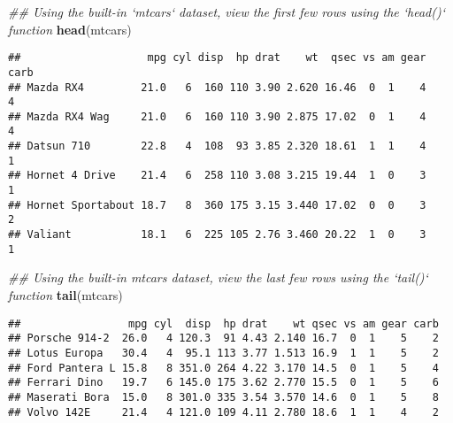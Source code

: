 \documentclass[
]{article}
\newenvironment{Shaded}{\begin{snugshade}}{\end{snugshade}}
\newcommand{\CommentTok}[1]{\textcolor[rgb]{0.56,0.35,0.01}{\textit{#1}}}
\newcommand{\KeywordTok}[1]{\textcolor[rgb]{0.13,0.29,0.53}{\textbf{#1}}}
\newcommand{\NormalTok}[1]{#1}
\begin{document}
\begin{Shaded}
\begin{Highlighting}[]
\CommentTok{## Using the built-in `mtcars` dataset, view the first few rows using the `head()` function}
\KeywordTok{head}\NormalTok{(mtcars)}
\end{Highlighting}
\end{Shaded}

\begin{verbatim}
##                    mpg cyl disp  hp drat    wt  qsec vs am gear carb
## Mazda RX4         21.0   6  160 110 3.90 2.620 16.46  0  1    4    4
## Mazda RX4 Wag     21.0   6  160 110 3.90 2.875 17.02  0  1    4    4
## Datsun 710        22.8   4  108  93 3.85 2.320 18.61  1  1    4    1
## Hornet 4 Drive    21.4   6  258 110 3.08 3.215 19.44  1  0    3    1
## Hornet Sportabout 18.7   8  360 175 3.15 3.440 17.02  0  0    3    2
## Valiant           18.1   6  225 105 2.76 3.460 20.22  1  0    3    1
\end{verbatim}

\begin{Shaded}
\begin{Highlighting}[]
\CommentTok{## Using the built-in mtcars dataset, view the last few rows using the `tail()` function}
\KeywordTok{tail}\NormalTok{(mtcars)}
\end{Highlighting}
\end{Shaded}

\begin{verbatim}
##                 mpg cyl  disp  hp drat    wt qsec vs am gear carb
## Porsche 914-2  26.0   4 120.3  91 4.43 2.140 16.7  0  1    5    2
## Lotus Europa   30.4   4  95.1 113 3.77 1.513 16.9  1  1    5    2
## Ford Pantera L 15.8   8 351.0 264 4.22 3.170 14.5  0  1    5    4
## Ferrari Dino   19.7   6 145.0 175 3.62 2.770 15.5  0  1    5    6
## Maserati Bora  15.0   8 301.0 335 3.54 3.570 14.6  0  1    5    8
## Volvo 142E     21.4   4 121.0 109 4.11 2.780 18.6  1  1    4    2
\end{verbatim}
\end{document}
